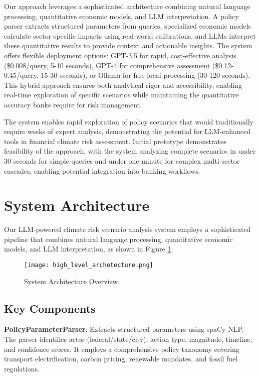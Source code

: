 \documentclass[conference]{IEEEtran}
\begin{document}
Our approach leverages a sophisticated architecture combining natural language processing, quantitative economic models, and LLM interpretation. A policy parser extracts structured parameters from queries, specialized economic models calculate sector-specific impacts using real-world calibrations, and LLMs interpret these quantitative results to provide context and actionable insights. The system offers flexible deployment options: GPT-3.5 for rapid, cost-effective analysis (\$0.008/query, 5-10 seconds), GPT-4 for comprehensive assessment (\$0.12-0.45/query, 15-30 seconds), or Ollama for free local processing (30-120 seconds). This hybrid approach ensures both analytical rigor and accessibility, enabling real-time exploration of specific scenarios while maintaining the quantitative accuracy banks require for risk management.

The system enables rapid exploration of policy scenarios that would traditionally require weeks of expert analysis, demonstrating the potential for LLM-enhanced tools in financial climate risk assessment. Initial prototype demonstrates feasibility of the approach, with the system analyzing complete scenarios in under 30 seconds for simple queries and under one minute for complex multi-sector cascades, enabling potential integration into banking workflows.

\section{System Architecture}

Our LLM-powered climate risk scenario analysis system employs a sophisticated pipeline that combines natural language processing, quantitative economic models, and LLM interpretation, as shown in Figure \ref{fig:architecture}:

\begin{figure}[htbp]
\centerline{\texttt{[image: high\_level\_archetecture.png]}}
\caption{System Architecture Overview}
\label{fig:architecture}
\end{figure}

\subsection{Key Components}

\textbf{PolicyParameterParser}: Extracts structured parameters using spaCy NLP. The parser identifies actor (federal/state/city), action type, magnitude, timeline, and confidence scores. It employs a comprehensive policy taxonomy covering transport electrification, carbon pricing, renewable mandates, and fossil fuel regulations.
\end{document}
